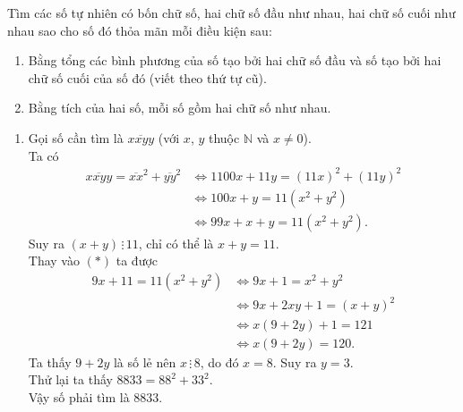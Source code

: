 \begin{bt}
 Tìm các số tự nhiên có bốn chữ số, hai chữ số đầu như nhau, hai chữ số cuối như nhau sao cho số đó thỏa mãn mỗi điều kiện sau:
 \begin{enumerate}
  \item Bằng tổng các bình phương của số tạo bởi hai chữ số đầu và số tạo bởi hai chữ số cuối của số đó (viết theo thứ tự cũ).
  \item Bằng tích của hai số, mỗi số gồm hai chữ số như nhau.
 \end{enumerate}
 \loigiai
  {
  \begin{enumerate}
   \item Gọi số cần tìm là $\overline{xxyy}$ (với $x$, $y$ thuộc $\mathbb{N}$ và $x \neq 0$).\\
   Ta có 
   {\allowdisplaybreaks
   \begin{align*}
    \overline{xxyy} = \overline{xx}^2 + \overline{yy}^2 & \Leftrightarrow 1100x + 11y = (11x)^2 + (11y)^2 \\
    & \Leftrightarrow 100x + y = 11(x^2 + y^2) \\
    & \Leftrightarrow 99x + x + y = 11 (x^2 + y^2).\tag{*} 
   \end{align*}}
   Suy ra $(x + y) \, \vdots \, 11$, chỉ có thể là $x + y = 11$.\\
   Thay vào $(*)$ ta được
   \begin{align*}
    9x + 11 = 11(x^2 + y^2) & \Leftrightarrow 9x + 1 = x^2 + y^2 \\
    & \Leftrightarrow 9x + 2xy + 1 = (x + y)^2 \\
    & \Leftrightarrow x(9 + 2y) + 1 = 121 \\
    & \Leftrightarrow x(9 + 2y) = 120.
   \end{align*}
   Ta thấy $9 + 2y$ là số lẻ nên $x \, \vdots \, 8$, do đó $x = 8$. Suy ra $y = 3$.\\
   Thử lại ta thấy $8833 = 88^2 + 33^2$.\\
   Vậy số phải tìm là $8833$.
   

\end{enumerate}}
\end{bt}
